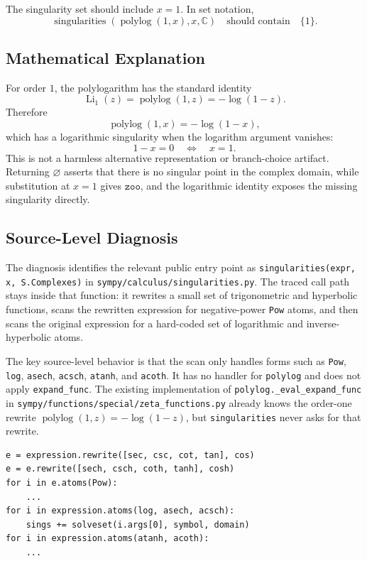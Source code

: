 \documentclass[11pt]{article}
\begin{document}
The singularity set should include \(x=1\).  In set notation,
\[
\operatorname{singularities}(\operatorname{polylog}(1,x),x,\mathbb{C})
\quad\text{should contain}\quad \{1\}.
\]

\subsection{Mathematical Explanation}

For order \(1\), the polylogarithm has the standard identity
\[
\operatorname{Li}_1(z)=\operatorname{polylog}(1,z)=-\log(1-z).
\]
Therefore
\[
\operatorname{polylog}(1,x)=-\log(1-x),
\]
which has a logarithmic singularity when the logarithm argument vanishes:
\[
1-x=0 \quad\Longleftrightarrow\quad x=1.
\]
This is not a harmless alternative representation or branch-choice artifact.  Returning \(\varnothing\) asserts that there is no singular point in the complex domain, while substitution at \(x=1\) gives \(\mathtt{zoo}\), and the logarithmic identity exposes the missing singularity directly.

\subsection{Source-Level Diagnosis}

The diagnosis identifies the relevant public entry point as \texttt{singularities(expr, x, S.Complexes)} in \nolinkurl{sympy/calculus/singularities.py}.  The traced call path stays inside that function: it rewrites a small set of trigonometric and hyperbolic functions, scans the rewritten expression for negative-power \texttt{Pow} atoms, and then scans the original expression for a hard-coded set of logarithmic and inverse-hyperbolic atoms.

The key source-level behavior is that the scan only handles forms such as \texttt{Pow}, \texttt{log}, \texttt{asech}, \texttt{acsch}, \texttt{atanh}, and \texttt{acoth}.  It has no handler for \texttt{polylog} and does not apply \texttt{expand\_func}.  The existing implementation of \texttt{polylog.\_eval\_expand\_func} in \nolinkurl{sympy/functions/special/zeta_functions.py} already knows the order-one rewrite \(\operatorname{polylog}(1,z)=-\log(1-z)\), but \texttt{singularities} never asks for that rewrite.

\begin{lstlisting}[style=bugpython]
e = expression.rewrite([sec, csc, cot, tan], cos)
e = e.rewrite([sech, csch, coth, tanh], cosh)
for i in e.atoms(Pow):
    ...
for i in expression.atoms(log, asech, acsch):
    sings += solveset(i.args[0], symbol, domain)
for i in expression.atoms(atanh, acoth):
    ...
\end{lstlisting}
\end{document}
